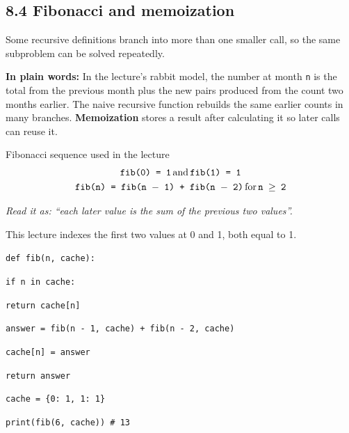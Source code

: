 \documentclass[11pt]{article}
\begin{document}
\begin{keepsection}
\section{8.4 Fibonacci and memoization}

Some recursive definitions branch into more than one smaller call, so the same subproblem can be solved repeatedly.

\begin{plainbox}\textbf{In plain words:} In the lecture’s rabbit model, the number at month \texttt{n} is the total from the previous month plus the new pairs produced from the count two months earlier. The naive recursive function rebuilds the same earlier counts in many branches. \textbf{Memoization} stores a result after calculating it so later calls can reuse it.\end{plainbox}

\begin{equationcard}{Fibonacci sequence used in the lecture}
\[ \begin{gathered} \texttt{fib(0) = 1}\, \text{and}\, \texttt{fib(1) = 1} \\ \texttt{fib(n) = fib(n \ensuremath{-} 1) + fib(n \ensuremath{-} 2)}\, \text{for}\, \texttt{n \ensuremath{\geq} 2} \end{gathered} \]
{\small \emph{Read it as: “each later value is the sum of the previous two values”.}\par  This lecture indexes the first two values at 0 and 1, both equal to 1.}
\end{equationcard}
\begin{tcolorbox}[colback=Paperblue,colframe=Paperblue,boxrule=0pt,arc=0pt,left=7pt,right=7pt,top=5pt,bottom=5pt]\small\sloppy
\noindent\hspace*{0em}\texttt{def fib(n, cache):}\par
\noindent\hspace*{1em}\texttt{if n in cache:}\par
\noindent\hspace*{3em}\texttt{return cache[n]}\par
\noindent\hspace*{1em}\texttt{answer = fib(n - 1, cache) + fib(n - 2, cache)}\par
\noindent\hspace*{1em}\texttt{cache[n] = answer}\par
\noindent\hspace*{1em}\texttt{return answer}\par
\noindent\hspace*{0em}\texttt{}\par
\noindent\hspace*{0em}\texttt{cache = \{0: 1, 1: 1\}}\par
\noindent\hspace*{0em}\texttt{print(fib(6, cache)) \# 13}\par
\end{tcolorbox}


\end{keepsection}
\end{document}
